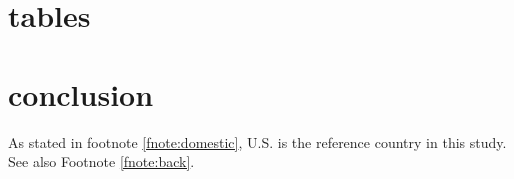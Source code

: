 \documentclass[11pt,letterpaper]{article}
\begin{document}
\newpage
\section{tables}











%

\newpage

\section{conclusion}

As stated in footnote \ref{fnote:domestic}, U.S. is the reference country in this study. See also Footnote \ref{fnote:back}.

\printbibliography
\end{document}
